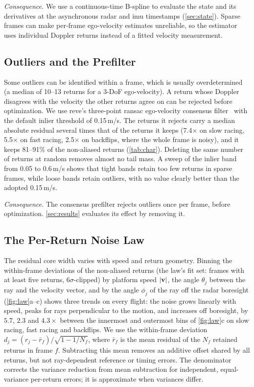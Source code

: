 \emph{Consequence.}  We use a continuous-time B-spline to evaluate the
state and its derivatives at the asynchronous radar and \ac{imu}
timestamps (\autoref{sec:state}).  Sparse frames can make per-frame
ego-velocity estimates unreliable, so the estimator uses individual
Doppler returns instead of a fitted velocity measurement.

\subsection{Outliers and the Prefilter}
\label{sec:char_outliers}
Some outliers can be identified within a frame, which is usually
overdetermined (a median of 10--13 returns for a 3-DoF ego-velocity).
A return whose Doppler disagrees with the velocity the other returns
agree on can be rejected before optimization.  We use \mbox{reve's}
three-point \ac{ransac} ego-velocity consensus filter~\cite{doer2020ekf} with the default inlier threshold of
0.15\,m/s.  The returns it rejects carry a
median absolute residual several times that of the returns it keeps
(7.4$\times$ on slow racing, 5.5$\times$ on fast racing, 2.5$\times$
on backflips, where the whole frame is noisy), and it keeps 81--91\%
of the non-aliased returns (\autoref{tab:char}). Deleting the same number of returns at random removes
almost no tail mass.  A sweep of the inlier band from 0.05 to
0.6\,m/s shows that tight bands retain too few returns in sparse frames,
while loose bands retain outliers, with no value clearly better than the
adopted 0.15\,m/s.

\emph{Consequence.}  The consensus prefilter rejects outliers once per
frame, before optimization.  \autoref{sec:results} evaluates its effect
by removing it.

\subsection{The Per-Return Noise Law}
\label{sec:char_rate}
The residual core width varies with speed and return geometry.  Binning
the within-frame deviations of the non-aliased returns (the law's fit
set: frames with at least five returns, $6\sigma$-clipped) by platform
speed $|\mathbf{v}|$, the angle
$\theta_j$ between the ray and the velocity vector, and by the angle
$\phi_j$ of the ray off the radar boresight (\autoref{fig:law}a--c)
shows three trends on every flight: the noise
grows linearly with speed, peaks for rays perpendicular to the motion,
and increases off boresight, by $5.7$, $2.3$ and $4.3\times$ between
the innermost and outermost bins of \autoref{fig:law}c on slow racing,
fast racing and backflips.
We use the within-frame deviation
$d_j = (r_j - \bar r_f)/\sqrt{1-1/N_f}$, where $\bar r_f$ is the mean
residual of the $N_f$ retained returns in frame $f$.  Subtracting this
mean removes an additive offset shared by all returns, but not
ray-dependent reference or timing errors.  The denominator corrects
the variance reduction from mean subtraction for independent,
equal-variance per-return errors; it is approximate when variances differ.

